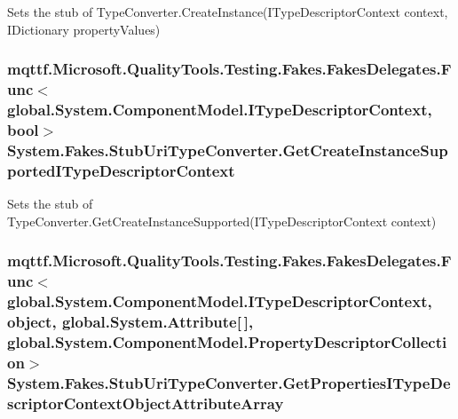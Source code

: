 Sets the stub of Type\-Converter.\-Create\-Instance(\-I\-Type\-Descriptor\-Context context, I\-Dictionary property\-Values)

\hypertarget{class_system_1_1_fakes_1_1_stub_uri_type_converter_a35758fba0825600b23fd4be20daf3516}{
\subsubsection[{Get\-Create\-Instance\-Supported\-I\-Type\-Descriptor\-Context}]{\setlength{\rightskip}{0pt plus 5cm}mqttf.\-Microsoft.\-Quality\-Tools.\-Testing.\-Fakes.\-Fakes\-Delegates.\-Func$<$global.\-System.\-Component\-Model.\-I\-Type\-Descriptor\-Context, bool$>$ System.\-Fakes.\-Stub\-Uri\-Type\-Converter.\-Get\-Create\-Instance\-Supported\-I\-Type\-Descriptor\-Context}}\label{class_system_1_1_fakes_1_1_stub_uri_type_converter_a35758fba0825600b23fd4be20daf3516}


Sets the stub of Type\-Converter.\-Get\-Create\-Instance\-Supported(\-I\-Type\-Descriptor\-Context context)

\hypertarget{class_system_1_1_fakes_1_1_stub_uri_type_converter_aeb1ec0652fa1f22fb25f5795202c62af}{
\subsubsection[{Get\-Properties\-I\-Type\-Descriptor\-Context\-Object\-Attribute\-Array}]{\setlength{\rightskip}{0pt plus 5cm}mqttf.\-Microsoft.\-Quality\-Tools.\-Testing.\-Fakes.\-Fakes\-Delegates.\-Func$<$global.\-System.\-Component\-Model.\-I\-Type\-Descriptor\-Context, object, global.\-System.\-Attribute\mbox{[}$\,$\mbox{]}, global.\-System.\-Component\-Model.\-Property\-Descriptor\-Collection$>$ System.\-Fakes.\-Stub\-Uri\-Type\-Converter.\-Get\-Properties\-I\-Type\-Descriptor\-Context\-Object\-Attribute\-Array}}\label{class_system_1_1_fakes_1_1_stub_uri_type_converter_aeb1ec0652fa1f22fb25f5795202c62af}


